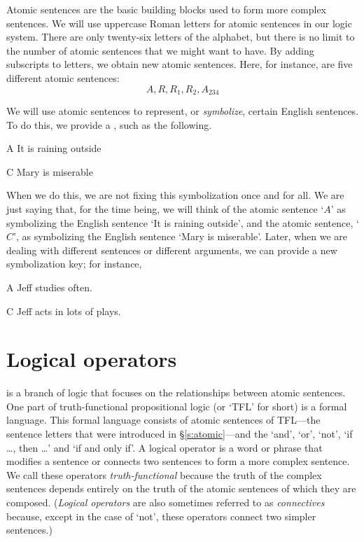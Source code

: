 Atomic sentences are the basic building blocks used to form more complex sentences. We will use uppercase Roman letters for atomic sentences in our logic system. There are only twenty-six letters of the alphabet, but there is no limit to the number of atomic sentences that we might want to have. By adding subscripts to letters, we obtain new atomic sentences. Here, for instance, are five different atomic sentences:
	$$A, R, R_1, R_2, A_{234}$$

We will use atomic sentences to represent, or \emph{symbolize}, certain English sentences. To do this, we provide a , such as the following.
	\begin{ekey}
		\item[A] It is raining outside
		\item[C] Mary is miserable
	\end{ekey}
When we do this, we are not fixing this symbolization once and for all. We are just saying that, for the time being, we will think of the atomic sentence `$A$' as symbolizing the English sentence `It is raining outside', and the atomic sentence, `$C$', as symbolizing the English sentence `Mary is miserable'. Later, when we are dealing with different sentences or different arguments, we can provide a new symbolization key; for instance, 
	\begin{ekey}
		\item[A] Jeff studies often.
		\item[C] Jeff acts in lots of plays.
	\end{ekey}






\chapter{Logical operators}
\label{s:TFLConnectives}

 is a branch of logic that focuses on the relationships between atomic sentences. One part of truth-functional propositional logic (or `TFL' for short) is a formal language. This formal language consists of atomic sentences of TFL---the sentence letters that were introduced in \S \ref{s:atomic}---and the  `and', `or', `not', `if \ldots, then \ldots' and `if and only if'. A logical operator is a word or phrase that modifies a sentence or connects two sentences to form a more complex sentence. We call these operators \textit{truth-functional} because the truth of the complex sentences depends entirely on the truth of the atomic sentences of which they are composed. (\textit{Logical operators} are also sometimes referred to as \textit{connectives} because, except in the case of `not', these operators connect two simpler sentences.)  

